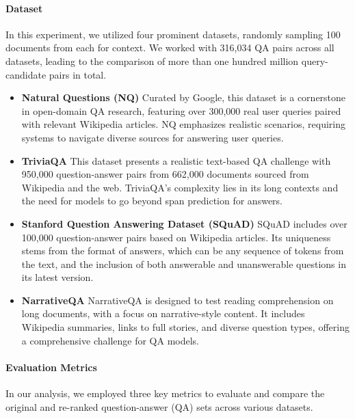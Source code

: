 \documentclass[11pt]{article}
\begin{document}
\paragraph{Dataset}
In this experiment, we utilized four prominent datasets, randomly sampling 100 documents from each for context. We worked with 316,034 QA pairs across all datasets, leading to the comparison of more than one hundred million query-candidate pairs in total.
\vspace{-0.1em}
\begin{itemize}
    \item \textbf{Natural Questions (NQ)}\cite{DBLP:journals/tacl/KwiatkowskiPRCP19} Curated by Google, this dataset is a cornerstone in open-domain QA research, featuring over 300,000 real user queries paired with relevant Wikipedia articles. NQ emphasizes realistic scenarios, requiring systems to navigate diverse sources for answering user queries.
    \vspace{-0.7em}
    \item \textbf{TriviaQA} This dataset presents a realistic text-based QA challenge with 950,000 question-answer pairs from 662,000 documents sourced from Wikipedia and the web. TriviaQA's complexity lies in its long contexts and the need for models to go beyond span prediction for answers.
    \vspace{-0.7em}
    \item \textbf{Stanford Question Answering Dataset (SQuAD)}\cite{DBLP:conf/emnlp/RajpurkarZLL16} SQuAD includes over 100,000 question-answer pairs based on Wikipedia articles. Its uniqueness stems from the format of answers, which can be any sequence of tokens from the text, and the inclusion of both answerable and unanswerable questions in its latest version.
    \vspace{-0.7em}
    \item \textbf{NarrativeQA}\cite{DBLP:journals/tacl/KociskySBDHMG18} NarrativeQA is designed to test reading comprehension on long documents, with a focus on narrative-style content. It includes Wikipedia summaries, links to full stories, and diverse question types, offering a comprehensive challenge for QA models.
\end{itemize}


\paragraph{Evaluation Metrics}
In our analysis, we employed three key metrics to evaluate and compare the original and re-ranked question-answer (QA) sets across various datasets.
\end{document}
